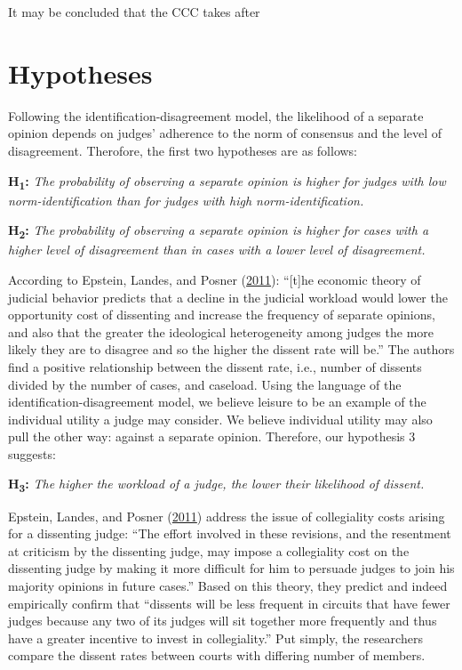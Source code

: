 \documentclass[
  11pt,
]{article}
\begin{document}
It may be concluded that the CCC takes after

\hypertarget{hypotheses}{%
\section{Hypotheses}\label{hypotheses}}

Following the identification-disagreement model, the likelihood of a
separate opinion depends on judges' adherence to the norm of consensus
and the level of disagreement. Therofore, the first two hypotheses are
as follows:

\textbf{H\textsubscript{1}:} \emph{The probability of observing a
separate opinion is higher for judges with low norm-identification than
for judges with high norm-identification.}

\textbf{H\textsubscript{2}:} \emph{The probability of observing a
separate opinion is higher for cases with a higher level of disagreement
than in cases with a lower level of disagreement.}

According to Epstein, Landes, and Posner
(\protect\hyperlink{ref-epsteinWhyWhenJudges2011}{2011}): ``{[}t{]}he
economic theory of judicial behavior predicts that a decline in the
judicial workload would lower the opportunity cost of dissenting and
increase the frequency of separate opinions, and also that the greater
the ideological heterogeneity among judges the more likely they are to
disagree and so the higher the dissent rate will be.'' The authors find
a positive relationship between the dissent rate, i.e., number of
dissents divided by the number of cases, and caseload. Using the
language of the identification-disagreement model, we believe leisure to
be an example of the individual utility a judge may consider. We believe
individual utility may also pull the other way: against a separate
opinion. Therefore, our hypothesis 3 suggests:

\textbf{H\textsubscript{3}:} \emph{The higher the workload of a judge,
the lower their likelihood of dissent.}

Epstein, Landes, and Posner
(\protect\hyperlink{ref-epsteinWhyWhenJudges2011}{2011}) address the
issue of collegiality costs arising for a dissenting judge: ``The effort
involved in these revisions, and the resentment at criticism by the
dissenting judge, may impose a collegiality cost on the dissenting judge
by making it more difficult for him to persuade judges to join his
majority opinions in future cases.'' Based on this theory, they predict
and indeed empirically confirm that ``dissents will be less frequent in
circuits that have fewer judges because any two of its judges will sit
together more frequently and thus have a greater incentive to invest in
collegiality.'' Put simply, the researchers compare the dissent rates
between courts with differing number of members.
\end{document}
